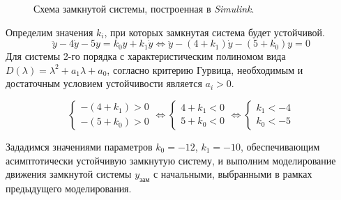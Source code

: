 \documentclass[a5paper, 10pt]{article}
\theoremstyle{definition}
\theoremstyle{plain}
\theoremstyle{remark}
\begin{document}
\begin{figure}[h!]
\caption{Схема замкнутой системы, построенная в \textit{Simulink}.}
\end{figure}

Определим значения $k_i$, при которых замкнутая система будет устойчивой.
\begin{equation}
 \ddot{y} -4 \dot{y} -5 y =  k_0y+ k_1 \dot{y} \Leftrightarrow \ddot{y} - \left(4 + k_1 \right) \dot{y} -\left(5 + k_0 \right) y = 0
\end{equation}
Для системы 2-го порядка с характеристическим полиномом вида $D(\lambda) = \lambda^2 + a_1 \lambda + a_0$, согласно критерию Гурвица, необходимым и достаточным условием устойчивости является $a_i > 0$.

\begin{equation}
\begin{cases}
- \left(4 + k_1 \right) > 0\\
 -\left(5 + k_0 \right) > 0
\end{cases}
 \Leftrightarrow 
\begin{cases}
4 + k_1 < 0\\
 5 + k_0 < 0
\end{cases}
 \Leftrightarrow 
\begin{cases}
 k_1 < -4\\
 k_0 < -5
\end{cases}
\end{equation}

Зададимся значениями параметров $k_0 = -12$, $k_1 = -10$, обеспечивающим асимптотически устойчивую замкнутую систему, и выполним моделирование движения замкнутой системы $y_{\text{зам}}$ с начальными, выбранными в рамках предыдущего моделирования.
\end{document}
